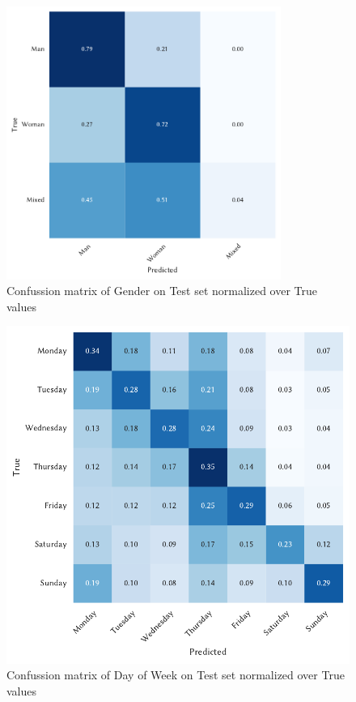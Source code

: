 \begin{figure}
    \centering
    \includegraphics[width=0.8\textwidth]{img/conf_matrix/authors_cum_gender_test_confusion_matrix.pdf}
    \caption{Confussion matrix of Gender on Test set normalized over True values}
    \label{fig:gender-conf}
\end{figure}
\begin{figure}
    \centering
    \includegraphics[width=1.0\textwidth]{img/conf_matrix/day_of_week_test_confusion_matrix.pdf}
    \caption{Confussion matrix of Day of Week on Test set normalized over True values}
    \label{fig:day-conf}
\end{figure}